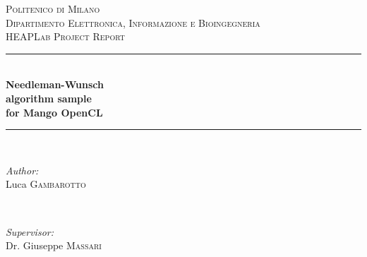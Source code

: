 \begin{titlepage}

\newcommand{\HRule}{\rule{\linewidth}{0.5mm}} %

\center %
 

\textsc{\LARGE Politenico di Milano}\\[1.5cm] %
\textsc{\Large Dipartimento Elettronica, Informazione e Bioingegneria}\\[0.5cm] %
\textsc{\large HEAPLab Project Report}\\[0.5cm] %


\HRule \\[0.4cm]
{ \huge \bfseries Needleman-Wunsch\\algorithm sample\\for Mango OpenCL}\\[0.4cm] %
\HRule \\[1.5cm]
 

\begin{minipage}{0.4\textwidth}
\begin{flushleft} \large
\emph{Author:}\\
Luca \textsc{Gambarotto} %
\end{flushleft}
\end{minipage}
~
\begin{minipage}{0.4\textwidth}
\begin{flushright} \large
\emph{Supervisor:} \\
Dr. Giuseppe \textsc{Massari} %
\end{flushright}
\end{minipage}\\[2cm]


\end{titlepage}
